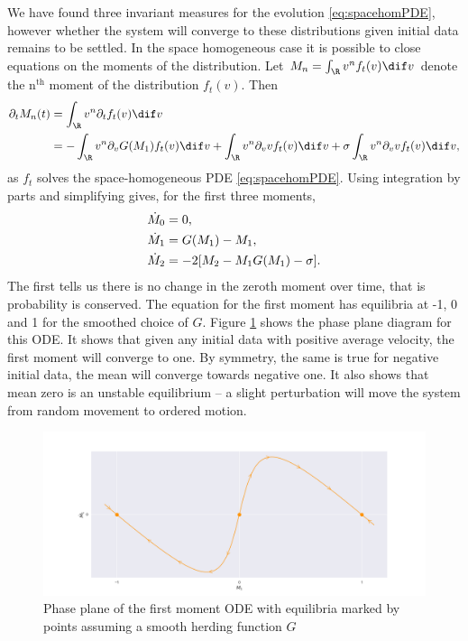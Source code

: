       We have found three invariant measures for the evolution \eqref{eq:spacehomPDE}, however whether the system will converge to these distributions given initial data remains to be settled. In the space homogeneous case it is possible to close equations on the moments of the distribution. Let $M_n = \int_\R v^n f_t(v) \dif v$ denote the n$^\text{th}$ moment of the distribution $f_t(v)$. Then
      \begin{align*}
      \partial_t M_n(t) &= \int_{\R}v^n \partial_t  f_t(v) \dif v\\
      &= - \int_{\R}v^n \partial_v G(M_1)f_t(v) \dif v + \int_{\R}v^n \partial_v vf_t(v) \dif v + \sigma \int_{\R}v^n \partial_vv f_t(v) \dif v,
      \end{align*}
      as $f_t$ solves the space-homogeneous PDE \eqref{eq:spacehomPDE}. Using integration by parts and simplifying gives, for the first three moments,
      \begin{align}\label{eq:momode}
      \dot{M}_0 &= 0,\notag \\
      \dot{M}_1 &= G(M_1) - M_1,\\
      \dot{M}_2 &= - 2\lbrack M_2 -  M_1G(M_1)  - \sigma\rbrack\notag.
      \end{align}
      The first tells us there is no change in the zeroth moment over time, that is probability is conserved. The equation for the first moment has equilibria at -1, 0 and 1 for the smoothed choice of $G$. Figure \ref{fig:M1phase} shows the phase plane diagram for this ODE. It shows that given any initial data with positive average velocity, the first moment will converge to one. By symmetry, the same is true for negative initial data, the mean will converge towards negative one. It also shows that mean zero is an unstable equilibrium -- a slight perturbation will move the system from random movement to ordered motion.
      \begin{figure}
          \centering
          \includegraphics[width=\linewidth]{Figures/M1phase}
          \caption{Phase plane of the first moment ODE with equilibria marked by points assuming a smooth herding function $G$}
          \label{fig:M1phase}
      \end{figure}
